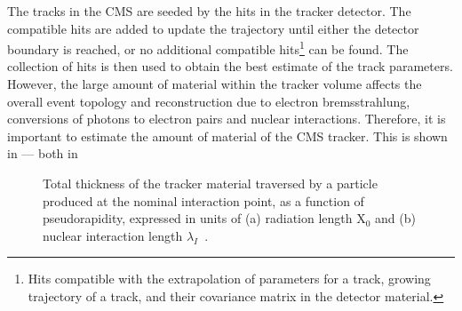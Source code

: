 The tracks in the CMS are seeded by the hits in the tracker detector. The compatible hits are added to update the trajectory 
until either the detector boundary is reached, or no additional compatible hits\footnote{Hits compatible with the extrapolation of parameters
for a track, growing trajectory of a track, and their covariance matrix in the detector material.} can be found. The collection of hits is then
used to obtain the best estimate of the track parameters. However, the large amount of material within the tracker volume affects the overall
event topology and reconstruction due to electron bremsstrahlung, conversions of photons to electron pairs and nuclear interactions.
Therefore, it is important to estimate the amount of material of the CMS tracker. This is shown in \fig{\ref{fig:MaterialBudget}} --- both in 
\begin{figure}[h!]
\centering
\hspace{0.5cm}
 \caption{Total thickness of the tracker material traversed by a particle produced at the nominal interaction point, as a function of pseudorapidity, expressed in units of (a) radiation length $\mathrm{X_0}$ and (b) nuclear interaction length $\lambda_I$~\cite{Chatrchyan:2014fea}.}
\label{fig:MaterialBudget}
\end{figure}
